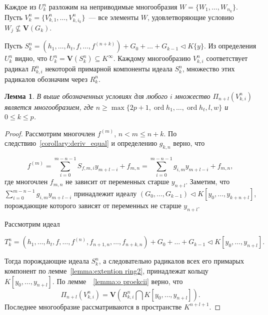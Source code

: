 \documentclass[16pt]{article}
\DeclareMathOperator{\ord}{ord}
\renewcommand{\le}{\leqslant} %
\renewcommand{\ge}{\geqslant} %
\theoremstyle{plain1}
\newtheorem{lemma}[theorem1]{Лемма}
\theoremstyle{plain2}
\theoremstyle{plain}
\theoremstyle{plain3}
\theoremstyle{definition}
\theoremstyle{remark}
\begin{document}
Каждое из ${U}^n_k$ разложим на неприводимые многообразия $W=\{{W}_{1},\ldots,{W}_{n_k}\}$. Пусть $V^n_k=\{{V}^n_{k,1},\ldots,{V}^n_{k,i_k}\}$~--- все элементы $W$, удовлетворяющие условию ${W}_{j}\not\subseteq\mathbf{V}(G_k)$.

Пусть  $S_k^n=\left(h_1,\ldots,h_t,f,\ldots,f^{(n+k)}\right)+G_0+\ldots+ G_{k-1}\triangleleft K\{y\}$. Из определения ${U}_k^n$ видно, что ${U}_k^n=\mathbf{V}(S_k^n)\subseteq K^{\infty}$. Каждому многообразию ${V}_{k,i}^n$ соответствует радикал $R_{k,i}^n$ некоторой примарной компоненты идеала $S_k^n$, множество этих радикалов обозначим через $R^n_k$.


\begin{lemma} \label{lemma:o_ideale}
 В выше обозначенных условиях для любого $i$ множество $\Pi_{n+l}({V}_{k,i}^n)$ является многообразием, где $n \ge\max\{ 2p+1,\ord{h_1},\ldots,\ord{h_t},l,w\}$ и  $0\le k\le p$.
\end{lemma}

\begin{proof}
Рассмотрим многочлен $f^{(m)}$, $n<m\le n+k$. По следствию~\ref{corollary:deriv_equal} и определению $g_{k,n}$ верно, что

$$
f^{(m)}= \sum\limits_{i=0}^{m-n-1} S_{f,m,i}y_{m+l -i} + f_{m,n}=\sum\limits_{i=0}^{m-n-1} g_{i,m}y_{m+l -i} + f_{m,n},
$$
где многочлен $f_{m,n}$ не зависит от переменных старше $y_{n+l}$. Заметим, что $\sum\limits_{i=0}^{m-n-1} g_{i,m}y_{m+l -i}$ принадлежит идеалу  $(G_0,\ldots, G_{k-1})\triangleleft K[y_0,\ldots,y_{k+n+l}]$,  порождающие которого зависят от переменных не старше $y_{n+l}$.

Рассмотрим идеал

$$
T_k^n=(h_1,\ldots,h_t,f,\ldots,f^{(n)},f_{n+1,n},\ldots,f_{n+k,n}) + G_0+\ldots+ G_{k-1}\triangleleft K[y_0,\ldots,y_{n+l}].
$$

Тогда порождающие идеала $S_k^n$, а следовательно радикалов всех его примарых компонент по лемме~\ref{lemma:extention ring2}, принадлежат кольцу $K[y_0,\ldots,y_{n+l}]$. По лемме~~\ref{lemma:o proekcii} верно, что
$$
\Pi_{n+l}({V}_{k,i}^n)=\mathbf{V}(R_{k,i}^n\bigcap K[y_0,\ldots,y_{n+l}]).
$$
Последнее многообразие рассматриваются в пространстве $K^{n+l+1}$.
\end{proof}
\end{document}
